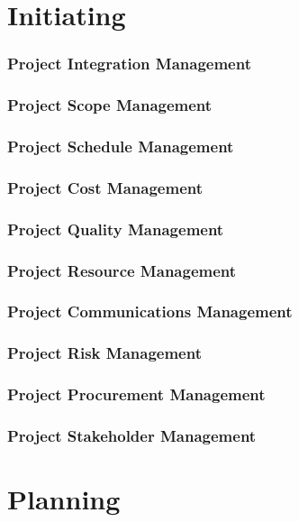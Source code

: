 \documentclass[12pt,letterpaper]{report}
\date{Revision Date: \today}
\author{Program Manager: Program Manager}
\title
{
	\Huge{\textbf{Project Management Plan}} \\
	\textbf{\projectname} \\ 
	\subtitle
}
\begin{document}
	\maketitle
	\tableofcontents
	
	\part{Initiating}
	\section{Project Integration Management}
	\section{Project Scope Management}
	\section{Project Schedule Management}
	\section{Project Cost Management}
	\section{Project Quality Management}
	\section{Project Resource Management}
	\section{Project Communications Management}
	\section{Project Risk Management}
	\section{Project Procurement Management}
	\section{Project Stakeholder Management}
	
	
	\part{Planning}
\end{document}
